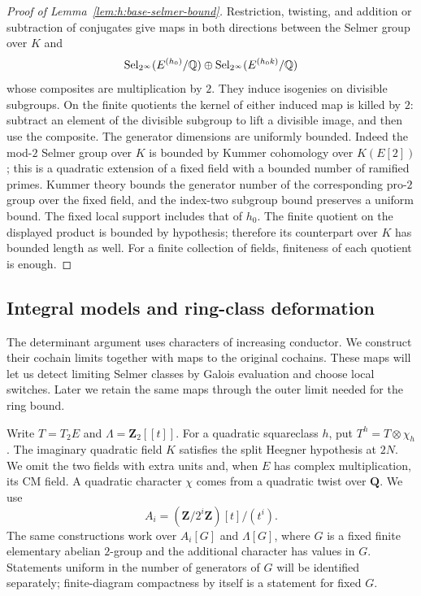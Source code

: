 \begin{proof}[Proof of Lemma~\ref{lem:h:base-selmer-bound}]
Restriction, twisting, and addition or subtraction of conjugates give
maps in both directions between the Selmer group over $K$ and
\[
 \operatorname{Sel}_{2^\infty}(E^{(h_0)}/\mathbb Q)
 \oplus\operatorname{Sel}_{2^\infty}(E^{(h_0k)}/\mathbb Q)
\]
whose composites are multiplication by $2$. They induce isogenies on
divisible subgroups. On the finite quotients the kernel of either induced
map is killed by $2$: subtract an element of the divisible subgroup to
lift a divisible image, and then use the composite. The generator
dimensions are uniformly bounded. Indeed the mod-$2$ Selmer group over
$K$ is bounded by Kummer cohomology over $K(E[2])$; this is a quadratic
extension of a fixed field with a bounded number of ramified primes.
Kummer theory bounds the generator number of the corresponding pro-$2$
group over the fixed field, and the index-two subgroup bound preserves
a uniform bound. The fixed local support includes that of $h_0$.
The finite quotient on the displayed product is bounded by hypothesis;
therefore its counterpart over $K$ has bounded length as well. For a
finite collection of fields, finiteness of each quotient is enough.
\end{proof}

\subsection{Integral models and ring-class deformation}
\label{rl:section}\label{sec:h:finite-models}

The determinant argument uses characters of increasing conductor.
We construct their cochain limits together with maps to the original
cochains. These maps will let us detect limiting Selmer classes by
Galois evaluation and choose local switches. Later we retain the same
maps through the outer limit needed for the ring bound.

Write $T=T_2E$ and $\Lambda=\mathbf Z_2[[t]]$. For a quadratic
squareclass $h$, put $T^h=T\otimes\chi_h$.  The imaginary quadratic field
$K$ satisfies the split Heegner hypothesis at $2N$.  We omit the two fields
with extra units and, when $E$ has complex multiplication, its CM field.
A quadratic character $\chi$ comes from a quadratic twist over $\mathbf Q$.
We use
\[
 A_i=(\mathbf Z/2^i\mathbf Z)[t]/(t^i).
\]
The same constructions work over $A_i[G]$ and $\Lambda[G]$, where $G$ is a
fixed finite elementary abelian $2$-group and the additional character has
values in $G$.  Statements uniform in the number of generators of $G$ will
be identified separately; finite-diagram compactness by itself is a statement
for fixed $G$.

